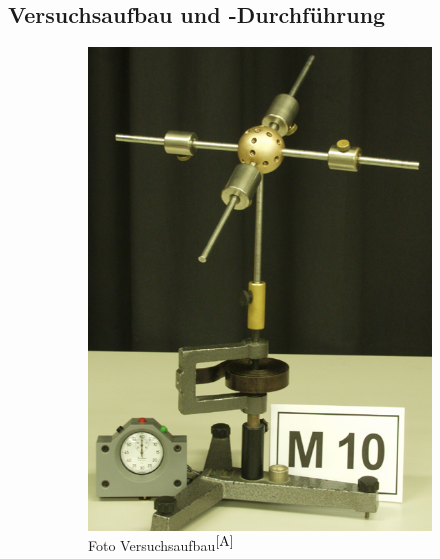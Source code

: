 \documentclass[fontsize=12pt]{scrartcl}
\begin{document}
\subsection{Versuchsaufbau und -Durchführung}
\begin{figure}[H]
        \centering
        \begin{subfigure}[H]{0.4\textwidth}
                \includegraphics[scale=0.7]{Graphik/Versuchsaufbau}
                \caption{Foto Versuchsaufbau$^{\cite{A}}$}
        \end{subfigure}%
        \begin{subfigure}[H]{0.4\textwidth}
        \vspace{60pt}

\end{subfigure}
\end{figure}
\end{document}

